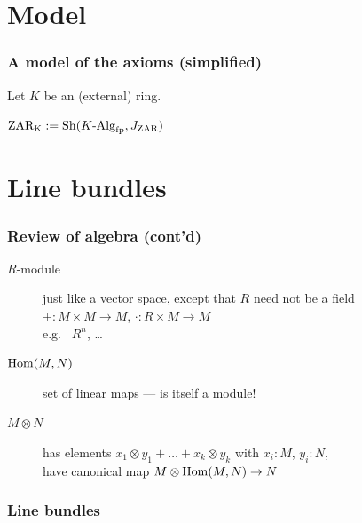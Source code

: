 \documentclass[aspectratio=1610]{beamer}
\begin{document}
\section{Model}

\begin{frame}
  \frametitle{A model of the axioms (simplified)}

  Let $K$ be an (external) ring.

  \bigskip
  $\mathrm{ZAR_K} := \mathrm{Sh}(K\text{-}\mathrm{Alg}_{\mathrm{fp}}, J_{\mathrm{ZAR}})$
\end{frame}

\appendix

\section{Line bundles}

\begin{frame}
  \frametitle{Review of algebra (cont'd)}

  \begin{description}
    \item[$R$-module]
      just like a vector space, except that $R$ need not be a field\\
      ${+} : M \times M \to M$, ${\cdot} : R \times M \to M$\\
      {
      e.g.\ %
      $R^n$,
      \dots}
      \pause%
    \bigskip
    \item[$\mathrm{Hom}(M, N)$]
      set of linear maps
      --- is itself a module!
      \pause%
    \bigskip
    \item[$M \otimes N$]
      has elements $x_1 \otimes y_1 + \dots + x_k \otimes y_k$ with $x_i : M$, $y_i : N$,\\
      have canonical map $M \otimes \mathrm{Hom}(M, N) \to N$
  \end{description}
\end{frame}

\begin{frame}
  \frametitle{Line bundles}
\end{frame}
\end{document}
